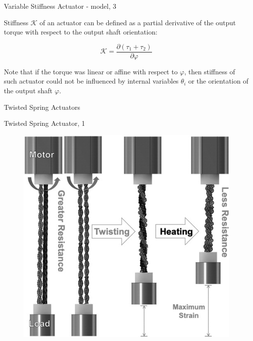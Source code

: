 \documentclass{beamer}
\begin{document}
\begin{frame}{Variable Stiffness Actuator - model, 3}
	\begin{flushleft}
		
		Stiffness $\mathcal{K}$ of an actuator can be defined as a partial derivative of the output torque with respect to the output shaft orientation:
		
		\begin{equation}
			\mathcal{K} = \frac{\partial (\tau_1 + \tau_2)}{\partial \varphi}
		\end{equation}
		
		Note that if the torque was linear or affine with respect to $\varphi$, then stiffness of such actuator could not be influenced by internal variables $\theta_i$ or the orientation of the output shaft $\varphi$.
		
		
		
	\end{flushleft}
\end{frame}


\begin{frame}
	\centerline{Twisted Spring Actuators}
\end{frame}


\begin{frame}{Twisted Spring Actuator, 1}
	\begin{flushleft}
		
		\begin{figure}
			\centering
			\includegraphics[width=0.7\linewidth]{TSA}
			\label{fig:tsa}
		\end{figure}
		
		
	\end{flushleft}
\end{frame}
\end{document}
